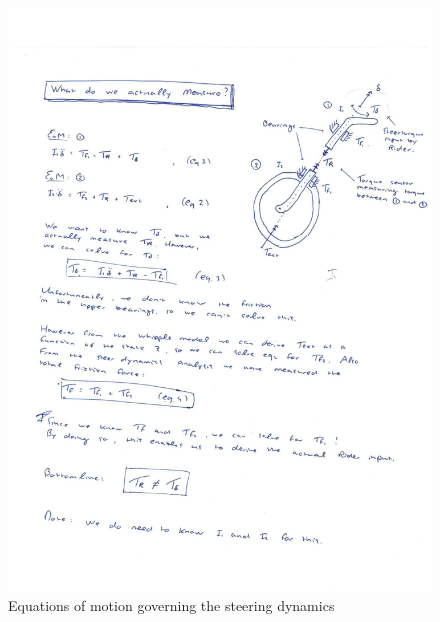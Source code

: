 		\begin{figure}
			\centering
				\includegraphics[width=16cm]{images/steeringequations.jpg}
				\caption{Equations of motion governing the steering dynamics}
				\label{fig:steer2}
		\end{figure}
